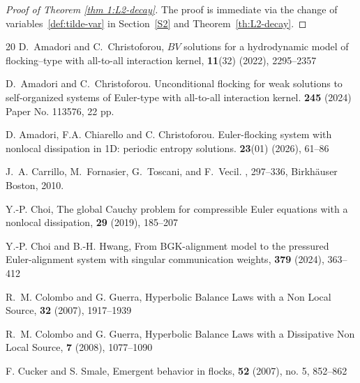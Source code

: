 \documentclass[10pt,reqno]{amsart}
\begin{document}
\begin{proof}[Proof of Theorem \ref{thm 1:L2-decay}]
The proof is immediate via the change of variables~\eqref{def:tilde-var} in Section~\ref{S2} and Theorem~\ref{th:L2-decay}.
\end{proof}

\small{
\begin{thebibliography}{20}
 D.~Amadori and C.~Christoforou,
\newblock $BV$ solutions for a hydrodynamic model of flocking--type with all-to-all interaction kernel,
 {\bf 11}(32) (2022), 2295--2357

 D.~Amadori and C.~Christoforou.
\newblock Unconditional flocking for weak solutions to self-organized systems 
of {E}uler-type with all-to-all interaction kernel.
 {\bf 245} (2024) Paper No. 113576, 22 pp.

 D. Amadori, F.A. Chiarello and C. Christoforou.
\newblock Euler-flocking system with nonlocal dissipation in 1D: periodic entropy solutions.
 {\bf 23}(01) (2026),  61--86 

 J.~A. Carrillo, M.~Fornasier, G.~Toscani, and F.~Vecil.
, 297--336,
\newblock Birkh\"{a}user Boston, 2010.

 {Y.-P. Choi},
\newblock The global Cauchy problem for compressible Euler equations with a nonlocal dissipation,
 {\bf 29} (2019), 185--207

 {Y.-P. Choi and B.-H. Hwang},
\newblock From BGK-alignment model to the pressured Euler-alignment system with singular communication weights,
 {\bf 379} (2024), 363--412

 R.~M. Colombo and G. Guerra,
\newblock Hyperbolic Balance Laws with a Non Local Source,
 \textbf{32} (2007), 1917--1939

 R.~M. Colombo and G. Guerra,
\newblock Hyperbolic Balance Laws with a Dissipative Non Local Source,
 \textbf{7} (2008), 1077--1090

 F. Cucker and S. Smale, 
\newblock Emergent behavior in flocks,
 \textbf{52} (2007), no. 5, 852--862


\end{thebibliography}}
\end{document}
